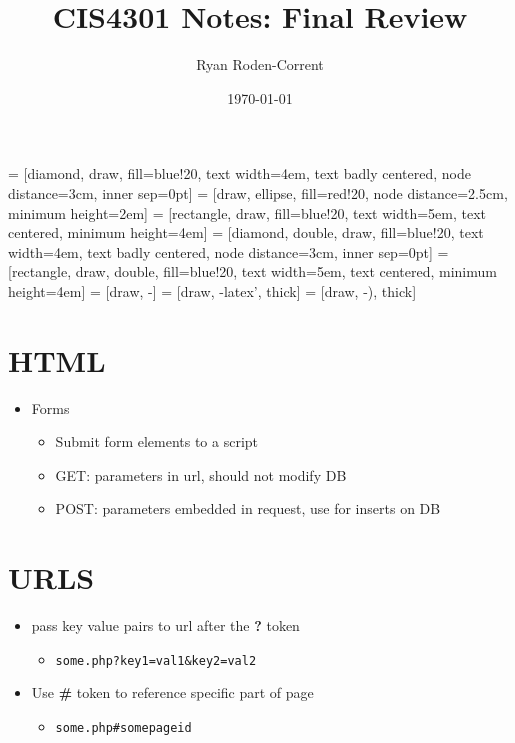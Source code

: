 \documentclass[12pt]{article}
\title{CIS4301 Notes: Final Review}
\author{Ryan Roden-Corrent}
\date{\today}
\begin{document}
\setlength\parindent{0pt}
 = [diamond, draw, fill=blue!20, text width=4em,
  text badly centered, node distance=3cm, inner sep=0pt]
 = [draw, ellipse, fill=red!20, node distance=2.5cm,
  minimum height=2em]
 = [rectangle, draw, fill=blue!20, text width=5em,
  text centered, minimum height=4em]
 = [diamond, double, draw, fill=blue!20, text width=4em,
  text badly centered, node distance=3cm, inner sep=0pt]
 = [rectangle, draw, double, fill=blue!20, text width=5em,
  text centered, minimum height=4em]
 = [draw, -]
 = [draw, -latex', thick]
 = [draw, -), thick]
\maketitle
\section{HTML}
\begin{itemize}
  \item {Forms
    \begin{itemize}
      \item {Submit form elements to a script}
      \item {GET: parameters in url, should not modify DB}
      \item {POST: parameters embedded in request, use for inserts on DB}
    \end{itemize}}
\end{itemize}
\section{URLS}
\begin{itemize}
  \item {pass key value pairs to url after the \textbf{?} token
    \begin{itemize}
      \item {\lstinline{some.php?key1=val1&key2=val2}}
    \end{itemize}}
  \item {Use \textbf{\#} token to reference specific part of page
    \begin{itemize}
      \item {\lstinline{some.php#somepageid}}
    \end{itemize}}
\end{itemize}
\end{document}
